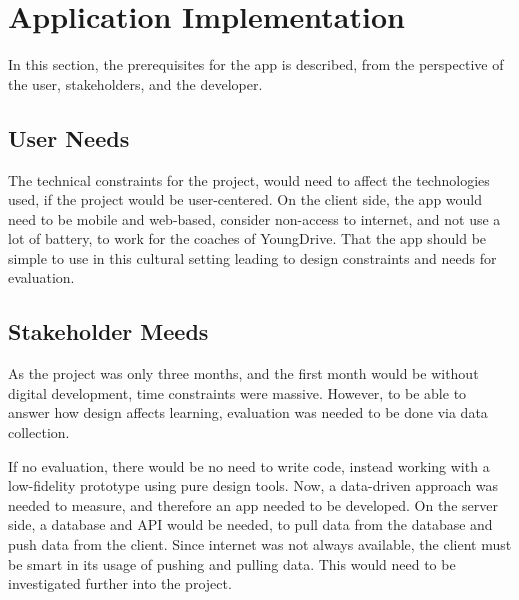 \section{Application Implementation}

In this section, the prerequisites for the app is described, from the perspective of the user, stakeholders, and the developer.

\subsection{User Needs}

The technical constraints for the project, would need to affect the technologies used, if the project would be user-centered. On the client side, the app would need to be mobile and web-based, consider non-access to internet, and not use a lot of battery, to work for the coaches of YoungDrive. That the app should be simple to use in this cultural setting leading to design constraints and needs for evaluation.

\subsection{Stakeholder Meeds}

As the project was only three months, and the first month would be without digital development, time constraints were massive. However, to be able to answer how design affects learning, evaluation was needed to be done via data collection.

If no evaluation, there would be no need to write code, instead working with a low-fidelity prototype using pure design tools. Now, a data-driven approach was needed to measure, and therefore an app needed to be developed. On the server side, a database and API would be needed, to pull data from the database and push data from the client. Since internet was not always available, the client must be smart in its usage of pushing and pulling data. This would need to be investigated further into the project.










